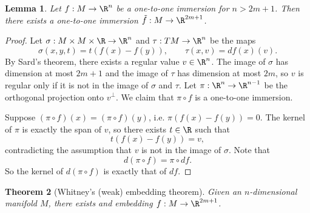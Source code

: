 \documentclass[reqno]{amsart}
\newtheorem{theorem}{Theorem}
\newtheorem{lemma}[theorem]{Lemma}
\theoremstyle{definition}
\theoremstyle{remark}
\begin{document}
\begin{lemma}
	Let $f: M \to \R^n$ be a one-to-one immersion for $n > 2m + 1$. Then there exists a one-to-one immersion $\tilde f : M \to \R^{2m + 1}$. 
\end{lemma}

\begin{proof}
	Let $\sigma: M \times M \times \R \to \R^n$ and $\tau: TM \to \R^n$ be the maps
		\[ \sigma(x, y, t) = t(f(x) - f(y)), \qquad \tau(x, v) = df (x)(v). \]
	By Sard's theorem, there exists a regular value $v \in \R^n$. The image of $\sigma$ has dimension at most $2m + 1$ and the image of $\tau$ has dimension at most $2m$, so $v$ is regular only if it is not in the image of $\sigma$ and $\tau$. Let $\pi : \R^n \to \R^{n - 1}$ be the orthogonal projection onto $v^\perp$. We claim that $\pi \circ f$ is a one-to-one immersion. 
	
	Suppose $(\pi \circ f) (x) = (\pi \circ f) (y)$, i.e. $\pi (f(x) - f(y)) = 0$. The kernel of $\pi$ is exactly the span of $v$, so there exists $t \in \R$ such that 
		\[ t(f(x) - f(y)) = v, \]
	contradicting the assumption that $v$ is not in the image of $\sigma$. Note that 
		\[ d(\pi \circ f) = \pi \circ df. \]
	So the kernel of $d(\pi \circ f)$ is exactly that of $df$. 
\end{proof}

\begin{theorem}[Whitney's (weak) embedding theorem]
	Given an $n$-dimensional manifold $M$, there exists and embedding $f: M \to \R^{2m + 1}$. 
\end{theorem}
\end{document}
